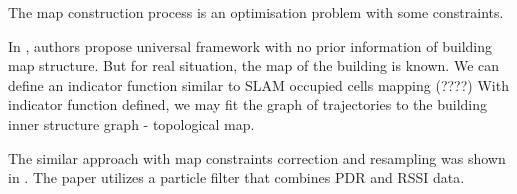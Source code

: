 \documentclass{article}
\begin{document}
The map construction process is an optimisation problem with some constraints.

In \cite{6827640}, authors propose universal framework with no prior information of building map structure.
But for real situation, the map of the building is known.
We can define an indicator function similar to SLAM occupied cells mapping (????)
With indicator function defined, we may fit the graph of trajectories to the building inner structure graph - topological map.

The similar approach with map constraints correction and resampling was shown in \cite{articleXia}. The paper utilizes a   particle   filter that combines PDR and RSSI data.



% 


\end{document}
